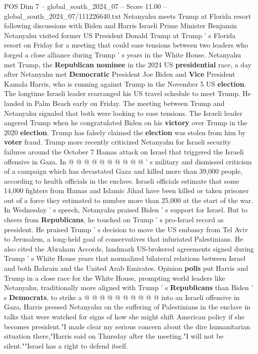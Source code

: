 \begin{textsample}{POS Dim 7 – global\_south\_2024\_07 – Score 11.00 – global\_south\_2024\_07/111226640.txt}  \label{ex:f7_pos_104}
Netanyahu meets Trump at Florida resort following discussions with Biden and Harris Israeli Prime Minister Benjamin Netanyahu visited former US President Donald Trump at Trump ' s Florida resort on Friday for a meeting that could ease tensions between two leaders who forged a close alliance during Trump ' s years in the White House.
Netanyahu met Trump, the \textbf{Republican} \textbf{nominee} in the 2024 US \textbf{presidential} race, a day after Netanyahu met \textbf{Democratic} President Joe Biden and \textbf{Vice} President Kamala Harris, who is running against Trump in the November 5 US \textbf{election}.
The longtime Israeli leader rearranged his US travel schedule to meet Trump.
He landed in Palm Beach early on Friday.
The meeting between Trump and Netanyahu signaled that both were looking to ease tensions.
The Israeli leader angered Trump when he congratulated Biden on his \textbf{victory} over Trump in the 2020 \textbf{election}.
Trump has falsely claimed the \textbf{election} was stolen from him by \textbf{voter} fraud.
Trump more recently criticized Netanyahu for Israeli security failures around the October 7 Hamas attack on Israel that triggered the Israeli offensive in Gaza.
In @ @ @ @ @ @ @ @ @ @ ' s military and dismissed criticism of a campaign which has devastated Gaza and killed more than 39,000 people, according to health officials in the enclave.
Israeli officials estimate that some 14,000 fighters from Hamas and Islamic Jihad have been killed or taken prisoner out of a force they estimated to number more than 25,000 at the start of the war.
In Wednesday ' s speech, Netanyahu praised Biden ' s support for Israel.
But to cheers from \textbf{Republicans}, he touched on Trump ' s pro-Israel record as president.
He praised Trump ' s decision to move the US embassy from Tel Aviv to Jerusalem, a long-held goal of conservatives that infuriated Palestinians.
He also cited the Abraham Accords, landmark US-brokered agreements signed during Trump ' s White House years that normalized bilateral relations between Israel and both Bahrain and the United Arab Emirates.
Opinion \textbf{polls} put Harris and Trump in a close race for the White House, prompting world leaders like Netanyahu, traditionally more aligned with Trump ' s \textbf{Republicans} than Biden ' s \textbf{Democrats}, to strike a @ @ @ @ @ @ @ @ @ @ into an Israeli offensive in Gaza, Harris pressed Netanyahu on the suffering of Palestinians in the enclave in talks that were watched for signs of how she might shift American policy if she becomes president."I made clear my serious concern about the dire humanitarian situation there,"Harris said on Thursday after the meeting."I will not be silent.""Israel has a right to defend itself.

\end{textsample}
